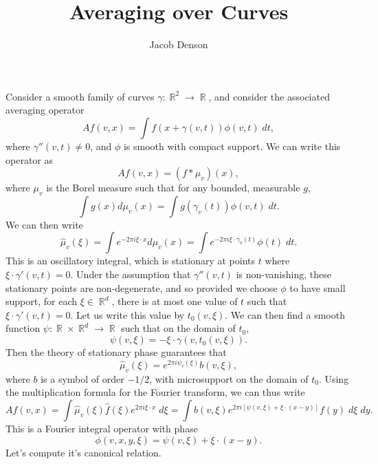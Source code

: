 \documentclass{article}
\title{Averaging over Curves}
\author{Jacob Denson}
\theoremstyle{plain}
\theoremstyle{remark}
\theoremstyle{definition}
\DeclareMathOperator{\RR}{\mathbb{R}}
\begin{document}
\maketitle

Consider a smooth family of curves $\gamma: \RR^2 \to \RR$, and consider the associated averaging operator
%
\[ Af(v,x) = \int f(x + \gamma(v,t)) \phi(v,t)\; dt, \]
%
where $\gamma''(v,t) \neq 0$, and $\phi$ is smooth with compact support. We can write this operator as
%
\[ Af(v,x) = (f * \mu_v)(x), \]
%
where $\mu_v$ is the Borel measure such that for any bounded, measurable $g$,
%
\[ \int g(x) d\mu_v(x) = \int g(\gamma_v(t)) \phi(v,t)\; dt. \]
%
We can then write
%
\[ \widehat{\mu}_v(\xi) = \int e^{-2 \pi i \xi \cdot x} d\mu_v(x) = \int e^{-2 \pi i \xi \cdot \gamma_v(t)} \phi(t)\; dt. \]
%
This is an oscillatory integral, which is stationary at points $t$ where $\xi \cdot \gamma'(v,t) = 0$. Under the assumption that $\gamma''(v,t)$ is non-vanishing, these stationary points are non-degenerate, and so provided we choose $\phi$ to have small support, for each $\xi \in \RR^d$, there is at most one value of $t$ such that $\xi \cdot \gamma'(v,t) = 0$. Let us write this value by $t_0(v,\xi)$. We can then find a smooth function $\psi: \RR \times \RR^d \to \RR$ such that on the domain of $t_0$,
%
\[ \psi(v,\xi) = - \xi \cdot \gamma(v,t_0(v,\xi)). \]
%
Then the theory of stationary phase guarantees that
%
\[ \widehat{\mu}_v(\xi) = e^{2 \pi i \psi_v(\xi)} b(v,\xi), \]
%
where $b$ is a symbol of order $-1/2$, with microsupport on the domain of $t_0$. Using the multiplication formula for the Fourier transform, we can thus write
%
\[ Af(v,x) = \int \widehat{\mu}_v(\xi) \widehat{f}(\xi) e^{2 \pi i \xi \cdot x}\; d\xi = \int b(v,\xi) e^{2 \pi i [\psi(v,\xi) + \xi \cdot (x - y)]} f(y)\; d\xi\; dy. \]
%
This is a Fourier integral operator with phase
%
\[ \phi(v,x,y,\xi) = \psi(v,\xi) + \xi \cdot (x - y). \]
%
Let's compute it's canonical relation.
\end{document}
